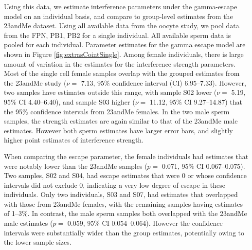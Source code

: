 Using this data, we estimate interference parameters under the gamma-escape model on an individual basis, and compare to group-level estimates from the 23andMe dataset\cite{Campbell2015}.
Using all available data from the oocyte study, we pool data from the FPN, PB1, PB2 for a single individual.
All available sperm data is pooled for each individual.
Parameter estimates for the gamma escape model are shown in Figure \ref{fig:extrasCointSingle}.
Among female individuals, there is large amount of variation in the estimates for the interference strength parameters.
Most of the single cell female samples overlap with the grouped estimates from the 23andMe study ($\nu=$ 7.13, 95\% confidence interval (CI) 6.95--7.33).
However, two samples have estimates outside this range, with sample S02 lower ($\nu=$ 5.19, 95\% CI 4.40--6.40), and sample S03 higher ($\nu=$ 11.12, 95\% CI 9.27--14.87) that the 95\% confidence intervals from 23andMe females.
In the two male sperm samples, the strength estimates are again similar to that of the 23andMe male estimates.
However both sperm estimates have larger error bars, and slightly higher point estimates of interference strength.

When comparing the escape parameter, the female individuals had estimates that were notably lower than the 23andMe samples ($p=$ 0.071, 95\% CI 0.067--0.075).
Two samples, S02 and S04, had escape estimates that were 0 or whose confidence intervals did not exclude 0, indicating a very low degree of escape in these individuals.
Only two individuals, S03 and S07, had estimates that overlapped with those from 23andMe females, with the remaining samples having estimates of 1--3\%.
In contrast, the male sperm samples both overlapped with the 23andMe male estimates ($p=$ 0.059, 95\% CI 0.054--0.064).
However the confidence intervals were substantially wider than the group estimates, potentially owing to the lower sample sizes.


